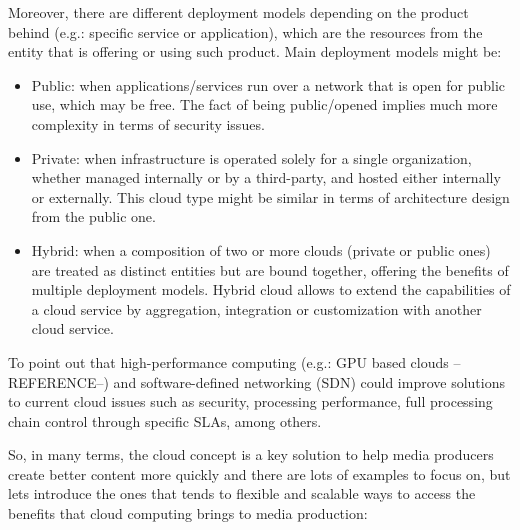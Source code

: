 Moreover, there are different deployment models depending on the product behind (e.g.: specific service or application), which are the resources from the entity that is offering or using such product. Main deployment models might be:

\begin{itemize}
\item Public: when applications/services run over a network that is open for public use, which may be free. The fact of being public/opened implies much more complexity in terms of security issues.
\item Private: when infrastructure is operated solely for a single organization, whether managed internally or by a third-party, and hosted either internally or externally. This cloud type might be similar in terms of architecture design from the public one.
\item Hybrid: when a composition of two or more clouds (private or public ones) are treated as distinct entities but are bound together, offering the benefits of multiple deployment models. Hybrid cloud allows to extend the capabilities of a cloud service by aggregation, integration or customization with another cloud service.
\end{itemize}

To point out that high-performance computing (e.g.: GPU based clouds --REFERENCE--) and software-defined networking (SDN) could improve solutions to current cloud issues such as security, processing performance, full processing chain control through specific SLAs, among others.

So, in many terms, the cloud concept is a key solution to help media producers create better content more quickly and there are lots of examples to focus on, but lets introduce the ones that tends to flexible and scalable ways to access the benefits that cloud computing brings to media production:

